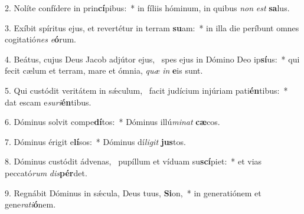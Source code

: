 2. Nolíte confídere in prin\textbf{cí}pibus:~*  in fíliis hóminum, in quibus \textit{non} \textit{est} \textbf{sa}lus.\

3. Exíbit spíritus ejus, et revertétur in terram \textbf{su}am:~*  in illa die períbunt omnes cogitatió\textit{nes} \textit{e}\textbf{ó}rum.\

4. Beátus, cujus Deus Jacob adjútor ejus, \dag\  spes ejus in Dómino Deo ip\textbf{sí}us:~*  qui fecit cælum et terram, mare et ómnia, \textit{quæ} \textit{in} \textbf{e}is sunt.\

5. Qui custódit veritátem in sǽculum, \dag\  facit judícium injúriam pati\textbf{én}tibus:~*  dat escam e\textit{su}\textit{ri}\textbf{én}tibus.\

6. Dóminus solvit compe\textbf{dí}tos:~*  Dóminus illú\textit{mi}\textit{nat} \textbf{cæ}cos.\

7. Dóminus érigit e\textbf{lí}sos:~*  Dóminus dí\textit{li}\textit{git} \textbf{jus}tos.\

8. Dóminus custódit ádvenas, \dag\  pupíllum et víduam su\textbf{scí}piet:~*  et vias peccató\textit{rum} \textit{dis}\textbf{pér}det.\

9. Regnábit Dóminus in sǽcula, Deus tuus, \textbf{Si}on,~*  in generatiónem et gene\textit{ra}\textit{ti}\textbf{ó}nem.\

